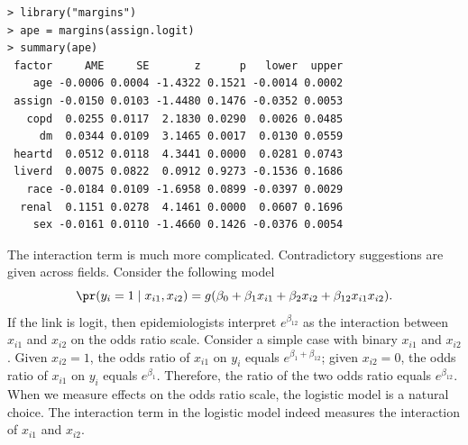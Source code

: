 \begin{lstlisting}
> library("margins")
> ape = margins(assign.logit)
> summary(ape)
 factor     AME     SE       z      p   lower  upper
    age -0.0006 0.0004 -1.4322 0.1521 -0.0014 0.0002
 assign -0.0150 0.0103 -1.4480 0.1476 -0.0352 0.0053
   copd  0.0255 0.0117  2.1830 0.0290  0.0026 0.0485
     dm  0.0344 0.0109  3.1465 0.0017  0.0130 0.0559
 heartd  0.0512 0.0118  4.3441 0.0000  0.0281 0.0743
 liverd  0.0075 0.0822  0.0912 0.9273 -0.1536 0.1686
   race -0.0184 0.0109 -1.6958 0.0899 -0.0397 0.0029
  renal  0.1151 0.0278  4.1461 0.0000  0.0607 0.1696
    sex -0.0161 0.0110 -1.4660 0.1426 -0.0376 0.0054
\end{lstlisting}    

  
 
The interaction term is much more complicated. Contradictory suggestions are given across fields. 
Consider
the following model
\[
\pr(y_{i}=1\mid x_{i1},x_{i2})=g(\beta_{0}+\beta_{1}x_{i1}+\beta_{2}x_{i2}+\beta_{12}x_{i1}x_{i2}).
\]
If the link is logit, then epidemiologists interpret $e^{\beta_{12}}$ as the interaction between $x_{i1}$ and $x_{i2}$ on the odds ratio scale. Consider a simple case with binary $x_{i1}$ and $x_{i2}$. Given $x_{i2} = 1$, the odds ratio of $x_{i1}$ on $y_i$ equals $e^{\beta_1 + \beta_{12}}$; given $x_{i2} = 0$, the odds ratio of $x_{i1}$ on $y_i$ equals $e^{\beta_1}$. Therefore, the ratio of the two odds ratio equals $e^{\beta_{12}}$.  When we measure effects on the odds ratio scale, the logistic model is a natural choice. The interaction term in the logistic model indeed measures the interaction of $x_{i1}$ and $x_{i2}$. 

